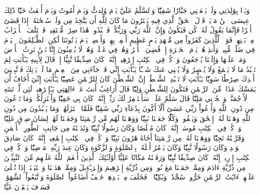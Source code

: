 وَبَرَّۢا بِوَٰلِدَتِي وَلَمۡ يَجۡعَلۡنِي جَبَّارٗا شَقِيّٗا
وَٱلسَّلَٰمُ عَلَيَّ يَوۡمَ وُلِدتُّ وَيَوۡمَ أَمُوتُ وَيَوۡمَ أُبۡعَثُ حَيّٗا
ذَٰلِكَ عِيسَى ٱبۡنُ مَرۡيَمَۖ قَوۡلَ ٱلۡحَقِّ ٱلَّذِي فِيهِ يَمۡتَرُونَ
مَا كَانَ لِلَّهِ أَن يَتَّخِذَ مِن وَلَدٖۖ سُبۡحَٰنَهُۥٓۚ إِذَا قَضَىٰٓ أَمۡرٗا فَإِنَّمَا يَقُولُ لَهُۥ كُن فَيَكُونُ
وَإِنَّ ٱللَّهَ رَبِّي وَرَبُّكُمۡ فَٱعۡبُدُوهُۚ هَٰذَا صِرَٰطٞ مُّسۡتَقِيمٞ
فَٱخۡتَلَفَ ٱلۡأَحۡزَابُ مِنۢ بَيۡنِهِمۡۖ فَوَيۡلٞ لِّلَّذِينَ كَفَرُواْ مِن مَّشۡهَدِ يَوۡمٍ عَظِيمٍ
أَسۡمِعۡ بِهِمۡ وَأَبۡصِرۡ يَوۡمَ يَأۡتُونَنَا لَٰكِنِ ٱلظَّـٰلِمُونَ ٱلۡيَوۡمَ فِي ضَلَٰلٖ مُّبِينٖ
وَأَنذِرۡهُمۡ يَوۡمَ ٱلۡحَسۡرَةِ إِذۡ قُضِيَ ٱلۡأَمۡرُ وَهُمۡ فِي غَفۡلَةٖ وَهُمۡ لَا يُؤۡمِنُونَ
إِنَّا نَحۡنُ نَرِثُ ٱلۡأَرۡضَ وَمَنۡ عَلَيۡهَا وَإِلَيۡنَا يُرۡجَعُونَ
وَٱذۡكُرۡ فِي ٱلۡكِتَٰبِ إِبۡرَٰهِيمَۚ إِنَّهُۥ كَانَ صِدِّيقٗا نَّبِيًّا
إِذۡ قَالَ لِأَبِيهِ يَـٰٓأَبَتِ لِمَ تَعۡبُدُ مَا لَا يَسۡمَعُ وَلَا يُبۡصِرُ وَلَا يُغۡنِي عَنكَ شَيۡـٔٗا
يَـٰٓأَبَتِ إِنِّي قَدۡ جَآءَنِي مِنَ ٱلۡعِلۡمِ مَا لَمۡ يَأۡتِكَ فَٱتَّبِعۡنِيٓ أَهۡدِكَ صِرَٰطٗا سَوِيّٗا
يَـٰٓأَبَتِ لَا تَعۡبُدِ ٱلشَّيۡطَٰنَۖ إِنَّ ٱلشَّيۡطَٰنَ كَانَ لِلرَّحۡمَٰنِ عَصِيّٗا
يَـٰٓأَبَتِ إِنِّيٓ أَخَافُ أَن يَمَسَّكَ عَذَابٞ مِّنَ ٱلرَّحۡمَٰنِ فَتَكُونَ لِلشَّيۡطَٰنِ وَلِيّٗا
قَالَ أَرَاغِبٌ أَنتَ عَنۡ ءَالِهَتِي يَـٰٓإِبۡرَٰهِيمُۖ لَئِن لَّمۡ تَنتَهِ لَأَرۡجُمَنَّكَۖ وَٱهۡجُرۡنِي مَلِيّٗا
قَالَ سَلَٰمٌ عَلَيۡكَۖ سَأَسۡتَغۡفِرُ لَكَ رَبِّيٓۖ إِنَّهُۥ كَانَ بِي حَفِيّٗا
وَأَعۡتَزِلُكُمۡ وَمَا تَدۡعُونَ مِن دُونِ ٱللَّهِ وَأَدۡعُواْ رَبِّي عَسَىٰٓ أَلَّآ أَكُونَ بِدُعَآءِ رَبِّي شَقِيّٗا
فَلَمَّا ٱعۡتَزَلَهُمۡ وَمَا يَعۡبُدُونَ مِن دُونِ ٱللَّهِ وَهَبۡنَا لَهُۥٓ إِسۡحَٰقَ وَيَعۡقُوبَۖ وَكُلّٗا جَعَلۡنَا نَبِيّٗا
وَوَهَبۡنَا لَهُم مِّن رَّحۡمَتِنَا وَجَعَلۡنَا لَهُمۡ لِسَانَ صِدۡقٍ عَلِيّٗا
وَٱذۡكُرۡ فِي ٱلۡكِتَٰبِ مُوسَىٰٓۚ إِنَّهُۥ كَانَ مُخۡلَصٗا وَكَانَ رَسُولٗا نَّبِيّٗا
وَنَٰدَيۡنَٰهُ مِن جَانِبِ ٱلطُّورِ ٱلۡأَيۡمَنِ وَقَرَّبۡنَٰهُ نَجِيّٗا
وَوَهَبۡنَا لَهُۥ مِن رَّحۡمَتِنَآ أَخَاهُ هَٰرُونَ نَبِيّٗا
وَٱذۡكُرۡ فِي ٱلۡكِتَٰبِ إِسۡمَٰعِيلَۚ إِنَّهُۥ كَانَ صَادِقَ ٱلۡوَعۡدِ وَكَانَ رَسُولٗا نَّبِيّٗا
وَكَانَ يَأۡمُرُ أَهۡلَهُۥ بِٱلصَّلَوٰةِ وَٱلزَّكَوٰةِ وَكَانَ عِندَ رَبِّهِۦ مَرۡضِيّٗا
وَٱذۡكُرۡ فِي ٱلۡكِتَٰبِ إِدۡرِيسَۚ إِنَّهُۥ كَانَ صِدِّيقٗا نَّبِيّٗا
وَرَفَعۡنَٰهُ مَكَانًا عَلِيًّا
أُوْلَـٰٓئِكَ ٱلَّذِينَ أَنۡعَمَ ٱللَّهُ عَلَيۡهِم مِّنَ ٱلنَّبِيِّـۧنَ مِن ذُرِّيَّةِ ءَادَمَ وَمِمَّنۡ حَمَلۡنَا مَعَ نُوحٖ وَمِن ذُرِّيَّةِ إِبۡرَٰهِيمَ وَإِسۡرَـٰٓءِيلَ وَمِمَّنۡ هَدَيۡنَا وَٱجۡتَبَيۡنَآۚ إِذَا تُتۡلَىٰ عَلَيۡهِمۡ ءَايَٰتُ ٱلرَّحۡمَٰنِ خَرُّواْۤ سُجَّدٗاۤ وَبُكِيّٗا۩
۞فَخَلَفَ مِنۢ بَعۡدِهِمۡ خَلۡفٌ أَضَاعُواْ ٱلصَّلَوٰةَ وَٱتَّبَعُواْ ٱلشَّهَوَٰتِۖ فَسَوۡفَ يَلۡقَوۡنَ غَيًّا
